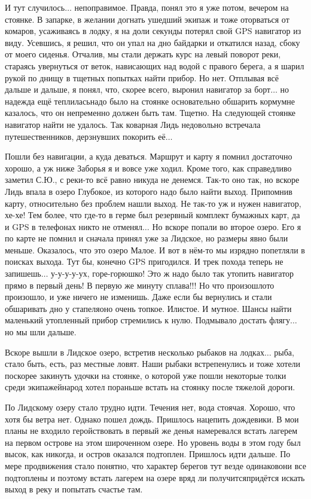 И тут случилось$\ldots$ непоправимое. Правда, понял это я уже потом, вечером на стоянке. В запарке, в желании догнать ушедший экипаж и тоже оторваться от комаров, усаживаясь в лодку, я на доли секунды потерял свой GPS навигатор из виду. Усевшись, я решил, что он упал на дно байдарки и откатился назад, сбоку от моего сиденья. Отчалив, мы стали держать курс на левый поворот реки, стараясь увернуться от веток, нависающих над водой с правого берега, а я шарил рукой по днищу в тщетных попытках найти прибор. Но нет. Отплывая всё дальше и дальше, я понял, что, скорее всего, выронил навигатор за борт$\ldots$ но надежда ещё теплилась\mdash надо было на стоянке основательно обшарить корму\mdash мне казалось, что он непременно должен быть там. Тщетно. На следующей стоянке навигатор найти не удалось. Так коварная Лидь недовольно встречала путешественников, дерзнувших покорить её$\ldots$

Пошли без навигации, а куда деваться. Маршрут и карту я помнил достаточно хорошо, а уж ниже Заборья я и вовсе уже ходил. Кроме того, как справедливо заметил С.Ю., с реки-то всё равно никуда не денемся. Так-то оно так, но вскоре Лидь впала в озеро Глубокое, из которого надо было найти выход. Припомнив карту, относительно без проблем нашли выход. Не так-то уж и нужен навигатор, хе-хе! Тем более, что где-то в герме был резервный комплект бумажных карт, да и GPS в телефонах никто не отменял$\ldots$ Но вскоре попали во второе озеро. Его я по карте не помнил и сначала принял уже за Лидское, но размеры явно были меньше. Оказалось, что это озеро Малое. И вот в нём-то мы изрядно попетляли в поисках выхода. Тут бы, конечно GPS пригодился. И трек похода теперь не запишешь$\ldots$ у-у-у-у-ух, горе-горюшко! Это ж надо было так утопить навигатор прямо в первый день! В первую же минуту сплава!!! Но что произошло\mdash то произошло, и уже ничего не изменишь. Даже если бы вернулись и стали обшаривать дно у стапеля\mdash оно очень топкое. Илистое. И мутное. Шансы найти маленький утопленный прибор стремились к нулю. Подмывало достать флягу$\ldots$ но мы шли дальше.

Вскоре вышли в Лидское озеро, встретив несколько рыбаков на лодках$\ldots$ рыба, стало быть, есть, раз местные ловят. Наши рыбаки встрепенулись и тоже хотели поскорее закинуть удочки на стоянке, о которой уже пошли некоторые толки среди экипажей\mdash народ хотел пораньше встать на стоянку после тяжелой дороги. 

По Лидскому озеру стало трудно идти. Течения нет, вода стоячая. Хорошо, что хотя бы ветра нет. Однако пошел дождь. Пришлось нацепить дождевики. В мои планы не входило геройствовать в первый же день\mdash я намеревался встать лагерем на первом острове на этом широченном озере. Но уровень воды в этом году был высок, как никогда, и остров оказался подтоплен. Пришлось идти дальше. По мере продвижения стало понятно, что характер берегов тут везде одинаков\mdash они все подтоплены и поэтому встать лагерем на озере вряд ли получится\mdash придётся искать выход в реку и попытать счастье там. 

